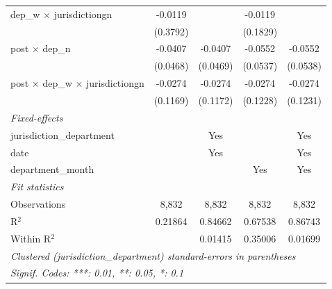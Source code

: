 \begin{tabular}{lcccc}
   dep\_w $\times$ jurisdictiongn                  & -0.0119         &                & -0.0119         &   \\   
                                                   & (0.3792)        &                & (0.1829)        &   \\   
   post $\times$ dep\_n                            & -0.0407         & -0.0407        & -0.0552         & -0.0552\\   
                                                   & (0.0468)        & (0.0469)       & (0.0537)        & (0.0538)\\   
   post $\times$ dep\_w $\times$ jurisdictiongn    & -0.0274         & -0.0274        & -0.0274         & -0.0274\\   
                                                   & (0.1169)        & (0.1172)       & (0.1228)        & (0.1231)\\   
   \midrule
   \emph{Fixed-effects}\\
   jurisdiction\_department                        &                 & Yes            &                 & Yes\\  
   date                                            &                 & Yes            &                 & Yes\\  
   department\_month                               &                 &                & Yes             & Yes\\  
   \midrule
   \emph{Fit statistics}\\
   Observations                                    & 8,832           & 8,832          & 8,832           & 8,832\\  
   R$^2$                                           & 0.21864         & 0.84662        & 0.67538         & 0.86743\\  
   Within R$^2$                                    &                 & 0.01415        & 0.35006         & 0.01699\\  
   \midrule \midrule
   \multicolumn{5}{l}{\emph{Clustered (jurisdiction\_department) standard-errors in parentheses}}\\
   \multicolumn{5}{l}{\emph{Signif. Codes: ***: 0.01, **: 0.05, *: 0.1}}\\
\end{tabular}
\par\endgroup
